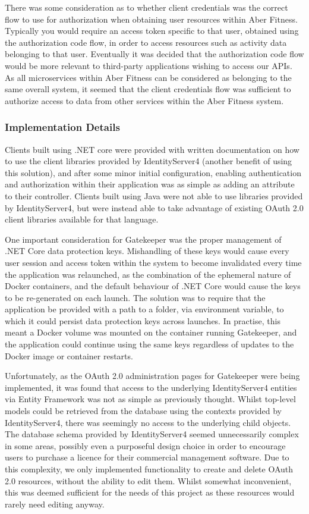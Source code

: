 There was some consideration as to whether client credentials was the correct flow to use for authorization when obtaining user resources within Aber Fitness. Typically you would require an access token specific to that user, obtained using the authorization code flow, in order to access resources such as activity data belonging to that user. Eventually it was decided that the authorization code flow would be more relevant to third-party applications wishing to access our APIs. As all microservices within Aber Fitness can be considered as belonging to the same overall system, it seemed that the client credentials flow was sufficient to authorize access to data from other services within the Aber Fitness system.

\subsubsection{Implementation Details}

Clients built using .NET core were provided with written documentation on how to use the client libraries provided by IdentityServer4 (another benefit of using this solution), and after some minor initial configuration, enabling authentication and authorization within their application was as simple as adding an attribute to their controller. Clients built using Java were not able to use libraries provided by IdentityServer4, but were instead able to take advantage of existing OAuth 2.0 client libraries available for that language.

One important consideration for Gatekeeper was the proper management of .NET Core data protection keys. Mishandling of these keys would cause every user session and access token within the system to become invalidated every time the application was relaunched, as the combination of the ephemeral nature of Docker containers, and the default behaviour of .NET Core would cause the keys to be re-generated on each launch. The solution was to require that the application be provided with a path to a folder, via environment variable, to which it could persist data protection keys across launches. In practise, this meant a Docker volume was mounted on the container running Gatekeeper, and the application could continue using the same keys regardless of updates to the Docker image or container restarts.

Unfortunately, as the OAuth 2.0 administration pages for Gatekeeper were being implemented, it was found that access to the underlying IdentityServer4 entities via Entity Framework was not as simple as previously thought. Whilst top-level models could be retrieved from the database using the contexts provided by IdentityServer4, there was seemingly no access to the underlying child objects. The database schema provided by IdentityServer4 seemed unnecessarily complex in some areas, possibly even a purposeful design choice in order to encourage users to purchase a licence for their commercial management software\cite{identityserver4adminui}. Due to this complexity, we only implemented functionality to create and delete OAuth 2.0 resources, without the ability to edit them. Whilst somewhat inconvenient, this was deemed sufficient for the needs of this project as these resources would rarely need editing anyway.

